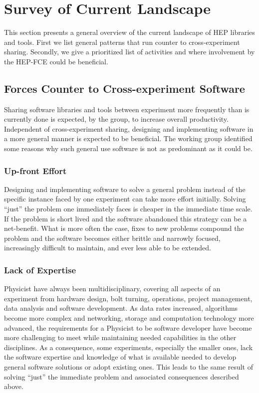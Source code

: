 \section{Survey of Current Landscape}


This section presents a general overview of the current landscape of
HEP libraries and tools.  
%
First we list general patterns that run counter to cross-experiment sharing.
%
%
Secondly, we give a prioritized list of activities and where involvement 
by the HEP-FCE could be beneficial.

\subsection{Forces Counter to Cross-experiment Software}

Sharing software libraries and tools between experiment more
frequently than is currently done is expected, by the group, to
increase overall productivity.  Independent of cross-experiment
sharing, designing and implementing software in a more general manner
is expected to be beneficial.  The working group
identified some reasons why such general use software is not as
predominant as it could be.

\subsubsection{Up-front Effort}

Designing and implementing software to solve a general problem instead
of the specific instance faced by one experiment can take more effort
initially.  Solving ``just'' the problem one immediately faces is
cheaper in the immediate time scale.  If the problem is short lived
and the software abandoned this strategy can be a net-benefit.  What
is more often the case, fixes to new problems compound the problem and
the software becomes either brittle and narrowly focused, increasingly
difficult to maintain, and ever less able to be extended.

\subsubsection{Lack of Expertise}

Physicist have always been multidisciplinary, covering all aspects of
an experiment from hardware design, bolt turning, operations, project
management, data analysis and software development.  As data rates
increased, algorithms become more complex and networking, storage and
computation technology more advanced, the requirements for a Physicist to
be software developer have become more challenging to meet while
maintaining needed capabilities in the other
disciplines.  As a consequence, some experiments, especially the smaller
ones, lack the software expertise and knowledge of what is available
needed to develop general software solutions or adopt existing ones.
This leads to the same result of solving ``just'' the immediate
problem and associated consequences described above.

